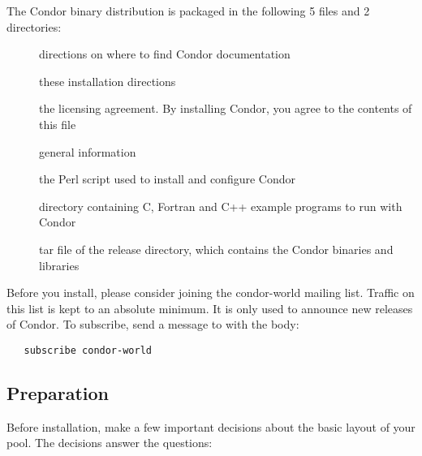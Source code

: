 The Condor binary distribution is packaged in the following 5 files
and 2 directories:

\begin{description}
\item[] directions on where to find Condor documentation
\item[] these installation directions
\item[] the licensing agreement.
                  By installing Condor, you agree to the contents of
		  this file
\item[] general information
\item[] the Perl script used to install and
                  configure Condor
\item[] directory containing C, Fortran and C++ example
		  programs to run with Condor
\item[] tar file of the release directory, which contains
		  the Condor binaries and libraries
\end{description}

Before you install, please consider joining the condor-world mailing
list.
Traffic on this list is kept to an absolute minimum.
It is only used to announce new releases of Condor.
To subscribe, send a message to  with the body:
\begin{verbatim}
   subscribe condor-world 
\end{verbatim}

\subsection{\label{sec:Preparing-to-Install}Preparation} 

Before installation, make a few important
decisions about the basic layout of your pool.
The decisions answer the questions:

